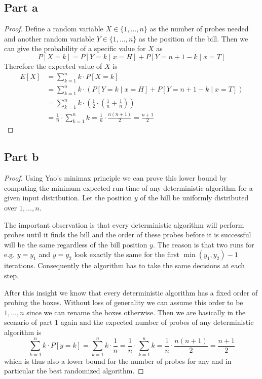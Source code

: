 \documentclass[10pt,a4paper]{article}
\begin{document}
\subsection*{Part a}

\begin{proof}
  Define a random variable $X \in \{ 1, \dots, n \}$ as the number of probes needed and another random variable $Y \in \{ 1, \dots, n \}$ as the position of the bill.
  Then we can give the probability of a specific value for $X$ as
  \begin{equation*}
    P[X = k] = P[Y = k \mid x = H] + P[Y = n + 1 - k \mid x = T]
  \end{equation*}
  Therefore the expected value of $X$ is
  \begin{align*}
    E[X] & = \sum_{k = 1}^{n} k \cdot P[X = k]\\
         & = \sum_{k = 1}^{n} k \cdot \left( P[Y = k \mid x = H] + P[Y = n + 1 - k \mid x = T] \right)\\
         & = \sum_{k = 1}^{n} k \cdot \left( \frac{1}{2} \cdot \left( \frac{1}{n} + \frac{1}{n} \right) \right)\\
         & = \frac{1}{n} \cdot \sum_{k = 1}^{n} k = \frac{1}{n} \cdot \frac{n(n + 1)}{2} = \frac{n + 1}{2}
  \end{align*}
\end{proof}

\subsection*{Part b}

\begin{proof}
  Using Yao's minimax principle we can prove this lower bound by computing the minimum expected run time of any deterministic algorithm for a given input distribution.
  Let the position $y$ of the bill be uniformly distributed over $1, \dots, n$.

  The important observation is that every deterministic algorithm will perform probes until it finds the bill and the order of these probes before it is successful will be the same regardless of the bill position $y$.
  The reason is that two runs for e.g. $y = y_{1}$ and $y = y_{2}$ look exactly the same for the first $\min(y_{1}, y_{2}) - 1$ iterations.
  Consequently the algorithm has to take the same decisions at each step.

  After this insight we know that every deterministic algorithm has a fixed order of probing the boxes.
  Without loss of generality we can assume this order to be $1, \dots, n$ since we can rename the boxes otherwise.
  Then we are basically in the scenario of part $1$ again and the expected number of probes of any deterministic algorithm is
  \begin{equation*}
    \sum_{k = 1}^{n} k \cdot P[y = k] = \sum_{k = 1}^{n} k \cdot \frac{1}{n} = \frac{1}{n} \cdot \sum_{k = 1}^{n} k = \frac{1}{n} \cdot \frac{n(n + 1)}{2} = \frac{n + 1}{2}
  \end{equation*}
  which is thus also a lower bound for the number of probes for any and in particular the best randomized algorithm.
\end{proof}
\end{document}
